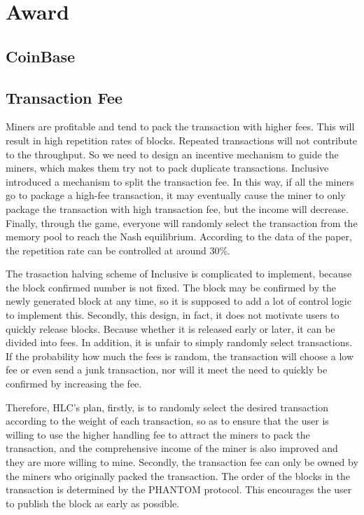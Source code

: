 \documentclass[a4paper,11pt]{article}
\begin{document}
\section{Award}
\subsection{CoinBase}
\subsection{Transaction Fee}

Miners are profitable and tend to pack the transaction with higher fees. This will result in high repetition rates of blocks. Repeated transactions will not contribute to the throughput. So we need to design an incentive mechanism to guide the miners, which makes them try not to pack duplicate transactions. Inclusive introduced a mechanism to split the transaction fee. In this way, if all the miners go to package a high-fee transaction, it may eventually cause the miner to only package the transaction with high transaction fee, but the income will decrease. Finally, through the game, everyone will randomly select the transaction from the memory pool to reach the Nash equilibrium. According to the data of the paper, the repetition rate can be controlled at around 30\%.

The trasaction halving scheme of Inclusive is complicated to implement, because the block confirmed number is not fixed. The block may be confirmed by the newly generated block at any time, so it is supposed to add a lot of control logic to implement this. Secondly, this design, in fact, it does not motivate users to quickly release blocks. Because whether it is released early or later, it can be divided into fees. In addition, it is unfair to simply randomly select transactions. If the probability how much the fees is random, the transaction will choose a low fee or even send a junk transaction, nor will it meet the need to quickly be confirmed by increasing the fee.

Therefore, HLC's plan, firstly, is to randomly select the desired transaction according to the weight of each transaction, so as to ensure that the user is willing to use the higher handling fee to attract the miners to pack the transaction, and the comprehensive income of the miner is also improved and they are more willing to mine. Secondly, the transaction fee can only be owned by the miners who originally packed the transaction. The order of the blocks in the transaction is determined by the PHANTOM protocol. This encourages the user to publish the block as early as possible.
\end{document}
